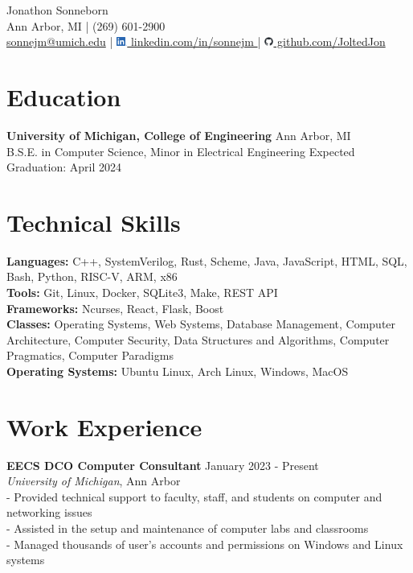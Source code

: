 \documentclass[9pt]{extarticle}
\begin{document}
\begin{center}
  {\Huge Jonathon Sonneborn} \\
  \vspace{2pt}
  Ann Arbor, MI \quad | \quad (269) 601-2900 \\
  \small \href{mailto:sonnejm@umich.edu}{sonnejm@umich.edu} \quad | \quad
  \href{https://www.linkedin.com/in/sonnejm/}{
    \includegraphics[height=0.3cm]{images/LI-In-Bug.png}
    linkedin.com/in/sonnejm
  } \quad | \quad
  \href{https://github.com/joltedjon}{
    \includegraphics[height=0.3cm]{images/github-mark.png}
    github.com/JoltedJon
  } \\
  \vspace{6pt}
\end{center}

\section*{Education}
\textbf{University of Michigan, College of Engineering} \hfill Ann Arbor, MI \\
B.S.E. in Computer Science, Minor in Electrical Engineering \hfill Expected Graduation: April 2024

\section*{Technical Skills}
\textbf{Languages:} C++, SystemVerilog, Rust, Scheme, Java, JavaScript, HTML, SQL, Bash, Python, RISC-V, ARM, x86 \\
\textbf{Tools:} Git, Linux, Docker, SQLite3, Make, REST API \\
\textbf{Frameworks:} Ncurses, React, Flask, Boost \\
\textbf{Classes:} Operating Systems, Web Systems, Database Management, Computer Architecture, Computer Security, Data Structures and Algorithms, Computer Pragmatics, Computer Paradigms\\
\textbf{Operating Systems:} Ubuntu Linux, Arch Linux, Windows, MacOS

\section*{Work Experience}
\textbf{EECS DCO Computer Consultant} \hfill January 2023 - Present \\
\textit{University of Michigan}, Ann Arbor \\
- Provided technical support to faculty, staff, and students on computer and networking issues \\
- Assisted in the setup and maintenance of computer labs and classrooms \\
- Managed thousands of user's accounts and permissions on Windows and Linux systems
\end{document}
